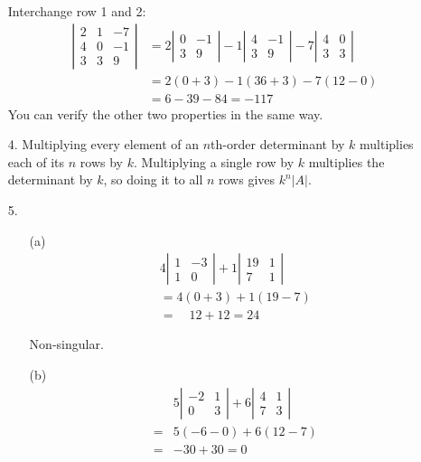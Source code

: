 \begin{enumerate}
Interchange row 1 and 2:
\[
\begin{aligned}
\left|\begin{array}{rrr}
2 & 1 & -7 \\
4 & 0 & -1 \\
3 & 3 & 9
\end{array}\right| &=2\left|\begin{array}{rr}
0 & -1 \\
3 & 9
\end{array}\right|-1\left|\begin{array}{cc}
4 & -1 \\
3 & 9
\end{array}\right|-7\left|\begin{array}{ll}
4 & 0 \\
3 & 3
\end{array}\right| \\
&=2(0+3)-1(36+3)-7(12-0) \\
&=6-39-84=-117
\end{aligned}
\]
You can verify the other two properties in the same way. \vspace{1em}

\item[4.] Multiplying every element of an $n$th-order determinant by $k$ multiplies each of its $n$ rows by $k$. Multiplying a single row by $k$ multiplies the determinant by $k$, so doing it to all $n$ rows gives $k^{n}|A|$.

\item[5.] 
\begin{enumerate}
\item[(a)] \[
\begin{array}{l}
4\left|\begin{array}{cc}
1 & -3 \\
1 & 0
\end{array}\right|+1\left|\begin{array}{cc}
19 & 1 \\
7 & 1
\end{array}\right| \\
=4(0+3)+1(19-7) \\
=\quad 12+12=24
\end{array}
\]

Non-singular. \\

\item[(b)] \[
\begin{aligned}
& 5\left|\begin{array}{cc}
-2 & 1 \\
0 & 3
\end{array}\right|+6 \left| \begin{array}{ll}
4 & 1 \\
7 & 3
\end{array}\right| \\
=& 5(-6-0)+6(12-7) \\
=&-30+30=0
\end{aligned}
\]


\end{enumerate}
\end{enumerate}
